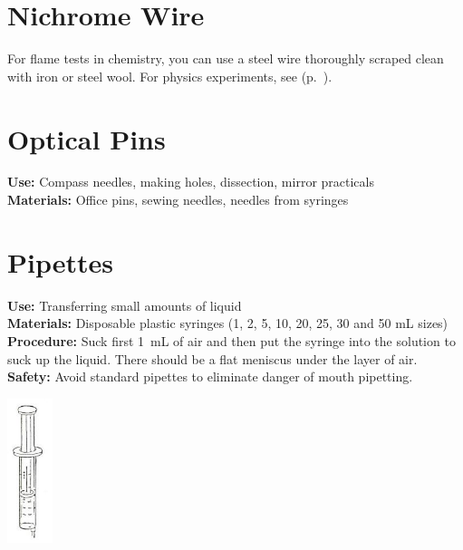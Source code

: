 \begin{multicols}{2}
\section{Nichrome Wire}
\label{sec:nichrome-wire}
For flame tests in chemistry, 
you can use a steel wire thoroughly scraped clean with iron or steel wool. 
For physics experiments, 
see  (p.~\pageref{sec:wire}).

\section{Optical Pins}
\label{sec:optical-pins}
\vspace{-10pt}
\textbf{Use:} Compass needles, making holes, dissection, mirror practicals\\
\textbf{Materials:} Office pins, sewing needles, needles from syringes

\section{Pipettes}
\label{sec:pipettes}
\vspace{-10pt}
\textbf{Use:} Transferring small amounts of liquid\\
\textbf{Materials:} Disposable plastic syringes (1, 2, 5, 10, 20, 25, 30 and 50 mL sizes)\\
\textbf{Procedure:} Suck first 1~mL of air and then put the syringe into the solution to suck up the liquid. There should be a flat meniscus under the layer of air.\\
\textbf{Safety:} Avoid standard pipettes to eliminate danger of mouth pipetting.
\begin{center}
\includegraphics[width=0.1\textwidth]{./img/source/syringe.jpg}
\end{center}



\end{multicols}
